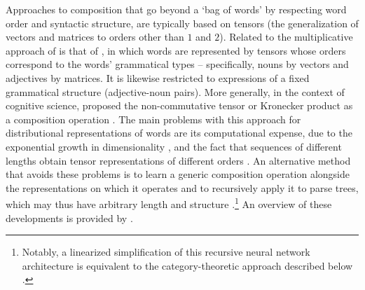 Approaches to composition that go beyond a `bag of words' by respecting word order and
syntactic structure, are typically based on tensors (the generalization of vectors and
matrices to orders other than $1$ and $2$).
Related to the multiplicative approach of \textcites{Mitchell2008}{Mitchell2010} is
that of \textcites{Baroni2010}, in which words are represented by tensors whose orders
correspond to the words' grammatical types -- specifically, nouns by vectors and
adjectives by matrices.
It is likewise restricted to expressions of a fixed grammatical structure
(adjective-noun pairs).
More generally, in the context of cognitive science, \textcites{Smolensky1990} proposed
the non-commutative tensor or Kronecker product as a composition operation
\parencites[see][]{Smolensky2006}.
The main problems with this approach for distributional representations of words are
its computational expense, due to the exponential growth in dimensionality
\parencites[19-20]{Grefenstette2013}, and the fact that sequences of different lengths
obtain tensor representations of different orders \parencites[1]{Clark2008}.
An alternative method that avoids these problems is to learn a generic composition
operation alongside the representations on which it operates and to recursively apply
it to parse trees, which may thus have arbitrary length and structure
\parencites{Socher2012}{Socher2013}.\footnote{Notably, a linearized simplification of
  this recursive neural network architecture is equivalent to the category-theoretic
  approach described below \parencites{Lewis2019a}.
}
An overview of these developments is provided by
\textcites[15-27]{Grefenstette2013}[18-24]{Kartsaklis2015}.

